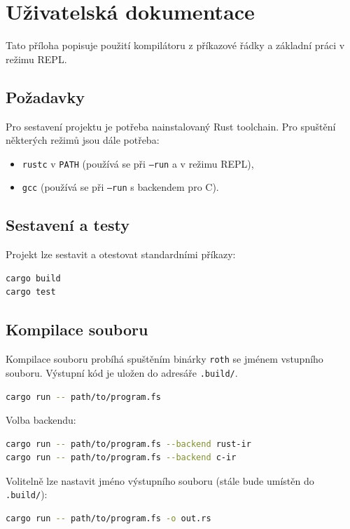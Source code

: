 \section{Uživatelská dokumentace}
\label{sec:dokumentace}

Tato příloha popisuje použití kompilátoru \Roth{} z příkazové řádky a základní
práci v režimu REPL.

\subsection{Požadavky}

Pro sestavení projektu je potřeba nainstalovaný Rust toolchain.
Pro spuštění některých režimů jsou dále potřeba:
\begin{itemize}
	\item \texttt{rustc} v \texttt{PATH} (používá se při \texttt{--run} a v režimu REPL),
	\item \texttt{gcc} (používá se při \texttt{--run} s backendem pro C).
\end{itemize}

\subsection{Sestavení a testy}

Projekt lze sestavit a otestovat standardními příkazy:
\begin{lstlisting}[language=bash, caption={Sestavení a testy}]
cargo build
cargo test
\end{lstlisting}

\subsection{Kompilace souboru}

Kompilace souboru probíhá spuštěním binárky \texttt{roth} se jménem vstupního
souboru. Výstupní kód je uložen do adresáře \texttt{.build/}.

\begin{lstlisting}[language=bash, caption={Kompilace souboru}]
cargo run -- path/to/program.fs
\end{lstlisting}

Volba backendu:
\begin{lstlisting}[language=bash, caption={Volba backendu}]
cargo run -- path/to/program.fs --backend rust-ir
cargo run -- path/to/program.fs --backend c-ir
\end{lstlisting}

Volitelně lze nastavit jméno výstupního souboru (stále bude umístěn do
\texttt{.build/}):
\begin{lstlisting}[language=bash, caption={Vlastní název výstupu}]
cargo run -- path/to/program.fs -o out.rs
\end{lstlisting}

